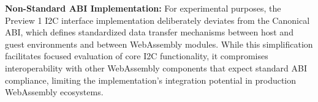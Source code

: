 \textbf{Non-Standard ABI Implementation:} For experimental purposes, the Preview 1 I2C interface implementation deliberately deviates from the Canonical ABI, which defines standardized data transfer mechanisms between host and guest environments and between WebAssembly modules. While this simplification facilitates focused evaluation of core I2C functionality, it compromises interoperability with other WebAssembly components that expect standard ABI compliance, limiting the implementation's integration potential in production WebAssembly ecosystems.



















